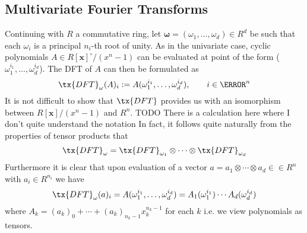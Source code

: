 \subsection{Multivariate Fourier Transforms}%
\label{sub:multivariate_fourier_transforms}

Continuing with $R$ a commutative ring, let $\mathbf{\omega} = (\omega_1, \ldots, \omega_d) \in R^d$ be such that each $\omega_i$ is a principal $n_i$-th root of unity. As in the univariate case, cyclic polynomials $A \in R[\mathbf{x}]^\circ/(x^n - 1)$ can be evaluated at point of the form ($\omega_1^{i_1}, \ldots, \omega_d^{i_d}$). The DFT of $A$ can then be formulated as 
\[
    \tx{DFT}_{\mathbf{\omega}}(A)_i := A(\omega_1^{i_1}, \ldots, \omega_d^{i_d}), \qquad i \in \N^n
\]
It is not difficult to show that $\tx{DFT}$ provides us with an isomorphism between $R[\mathbf{x}]/(x^n - 1)$ and $R^n$. TODO There is a calculation here where I don't quite understand the notation
In fact, it follows quite naturally from the properties of tensor products that
\[
    \tx{DFT}_{\mathbf{\omega}} = \tx{DFT}_{\omega_1} \otimes \cdots \otimes \tx{DFT}_{\omega_d}
\]
Furthermore it is clear that upon evaluation of a vector $a = a_1 \otimes \cdots \otimes a_d \in \in R^n$ with $a_i \in R^{n_i}$ we have
\[
    \tx{DFT}_{\mathbf{\omega}}(a)_i = A(\omega_1^{i_1}, \ldots, \omega_d^{i_d}) = A_1(\omega_1^{i_1}) \cdots A_d(\omega_d^{i_d})
\]
where $A_k = (a_k)_0 + \cdots + (a_k)_{n_k - 1}x_k^{n_k - 1}$ for each $k$ i.e. we view polynomials as tensors.
